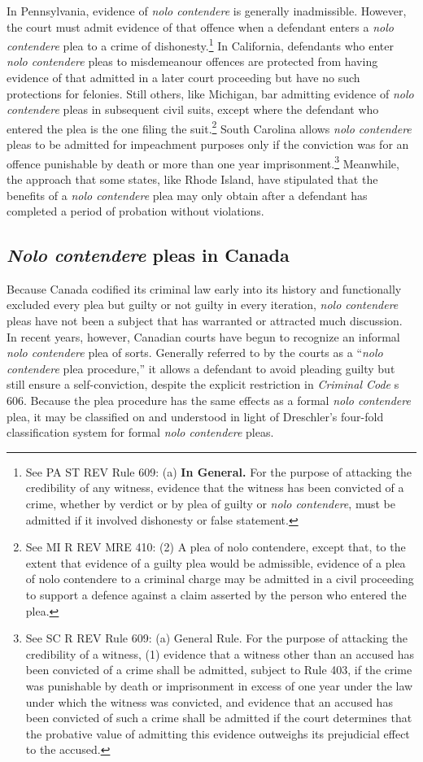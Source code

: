 In Pennsylvania, evidence of \textit{nolo contendere} is generally inadmissible. However, the court must admit evidence of that offence when a defendant enters a \textit{nolo contendere} plea to a crime of dishonesty.\footnote{See PA ST REV Rule 609: (a) \textbf{In General.} For the purpose of attacking the credibility of any witness, evidence that the witness has been convicted of a crime, whether by verdict or by plea of guilty or \textit{nolo contendere}, must be admitted if it involved dishonesty or false statement.} In California, defendants who enter \textit{nolo contendere} pleas to misdemeanour offences are protected from having evidence of that admitted in a later court proceeding but have no such protections for felonies. Still others, like Michigan, bar admitting evidence of \textit{nolo contendere} pleas in subsequent civil suits, except where the defendant who entered the plea is the one filing the suit.\footnote{See MI R REV MRE 410: (2) A plea of nolo contendere, except that, to the extent that evidence of a guilty plea would be admissible, evidence of a plea of nolo contendere to a criminal charge may be admitted in a civil proceeding to support a defence against a claim asserted by the person who entered the plea.} South Carolina allows \textit{nolo contendere} pleas to be admitted for impeachment purposes only if the conviction was for an offence punishable by death or more than one year imprisonment.\footnote{See SC R REV Rule 609: (a) General Rule. For the purpose of attacking the credibility of a witness, (1) evidence that a witness other than an accused has been convicted of a crime shall be admitted, subject to Rule 403, if the crime was punishable by death or imprisonment in excess of one year under the law under which the witness was convicted, and evidence that an accused has been convicted of such a crime shall be admitted if the court determines that the probative value of admitting this evidence outweighs its prejudicial effect to the accused.} Meanwhile, the approach that some states, like Rhode Island, have stipulated that the benefits of a \textit{nolo contendere} plea may only obtain after a defendant has completed a period of probation without violations.

\subsection{\textit{Nolo contendere} pleas in Canada}

Because Canada codified its criminal law early into its history and functionally excluded every plea but guilty or not guilty in every iteration, \textit{nolo contendere} pleas have not been a subject that has warranted or attracted much discussion. In recent years, however, Canadian courts have begun to recognize an informal \textit{nolo contendere} plea of sorts. Generally referred to by the courts as a ``\textit{nolo contendere} plea procedure,'' it allows a defendant to avoid pleading guilty but still ensure a self-conviction, despite the explicit restriction in \textit{Criminal Code} s 606. Because the plea procedure has the same effects as a formal \textit{nolo contendere} plea, it may be classified on and understood in light of Dreschler's four-fold classification system for formal \textit{nolo contendere} pleas.

